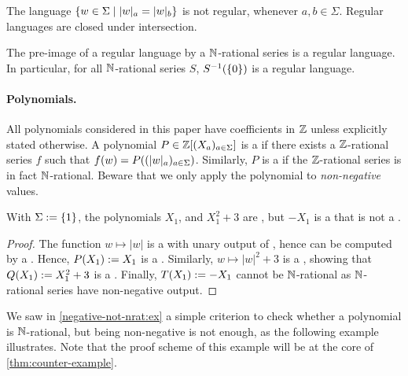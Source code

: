\documentclass[a4paper,11pt]{article}
\begin{document}
\begin{fact}
    \label{regular:fact}
    The language $\setof{ w \in \Sigma}{ \card[a]{w} = \card[b]{w}}$
    is not regular, whenever $a,b \in \Sigma$.
    Regular languages are closed under intersection.
\end{fact}

\begin{fact}
    \label{pre-image-regular:fact}
    The pre-image of a regular language by a $\mathbb{N}$-rational series
    is a regular language. In particular,
    for all $\mathbb{N}$-rational series $S$, $S^{-1}(\mathopen{\{} 0 \mathclose{\}})$ is a regular
    language.
\end{fact}



\AP \paragraph*{Polynomials.} All polynomials considered in this paper have
coefficients in $\mathbb{Z}$ unless explicitly stated otherwise. A polynomial $P \in
\mathbb{Z}[(X_a)_{a \in \Sigma}]$ is a  if
there exists a  $\mathbb{Z}$-rational series $f$ such that $f(w)
= P(\seqof{ \card[a]{w} }{a \in \Sigma})$. Similarly, $P$ is a
 if the  $\mathbb{Z}$-rational
series is in fact $\mathbb{N}$-rational. Beware that we only apply the polynomial
to \emph{non-negative} values.

\begin{example}
    \label{negative-not-nrat:ex}
    With $\Sigma \mathrel{:=} \mathopen{\{} 1 \mathclose{\}}$,
    the polynomials $X_1$, and $X_1^2 + 3$ are ,
    but $- X_1$ is a  that is 
    not a .
\end{example}
\begin{proof}
    The function $w \mapsto |w|$ is a  with unary
    output of , hence  can be computed by a
    . Hence, $P(X_1) \mathrel{:=} X_1$ is
    a . Similarly,
    $w \mapsto |w|^2 + 3$ is a ,
    showing that $Q(X_1) \mathrel{:=} X_1^2 + 3$
    is a .
    Finally, 
    $T(X_1) \mathrel{:=} - X_1$ cannot be $\mathbb{N}$-rational as $\mathbb{N}$-rational series
    have non-negative output.
\end{proof}

We saw in \cref{negative-not-nrat:ex}
a simple criterion to check whether a polynomial is $\mathbb{N}$-rational,
but being non-negative is not enough, as the following example
illustrates. Note that the proof scheme
of this example will be at the core of \cref{thm:counter-example}.
\end{document}
